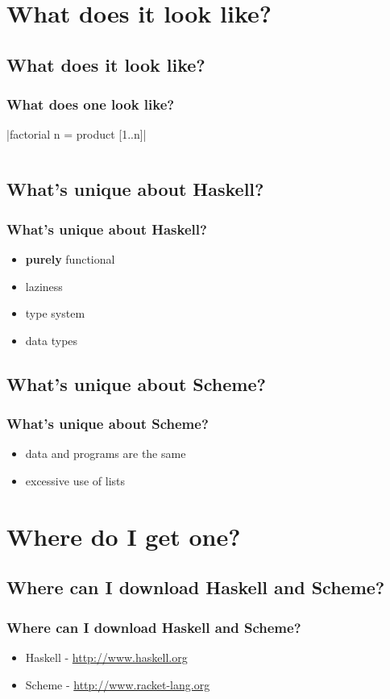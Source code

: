 \documentclass[xcolor=pdftex,dvipsnames,table]{beamer}
\begin{document}
\section{What does it look like?}
\subsection{What does it look like?}
\begin{frame}
  \frametitle{What does one look like?}
  |factorial n = product [1..n]|
  \inputminted{scheme}{fac.scm}
\end{frame}


\subsection{What's unique about Haskell?}
\begin{frame}
  \frametitle{What's unique about Haskell?}
  \begin{itemize}
  \item \textbf{purely} functional
  \item laziness
  \item type system
  \item data types
  \end{itemize}
\end{frame}

\subsection{What's unique about Scheme?}
\begin{frame}
  \frametitle{What's unique about Scheme?}
  \begin{itemize}
  \item data and programs are the same
  \item excessive use of lists
  \end{itemize}
\end{frame}

\section{Where do I get one?}
\subsection{Where can I download Haskell and Scheme?}
\begin{frame}
  \frametitle{Where can I download Haskell and Scheme?}
  \begin{itemize}
  \item Haskell - \url{http://www.haskell.org}
  \item Scheme - \url{http://www.racket-lang.org}
  \end{itemize}
\end{frame}
\end{document}
